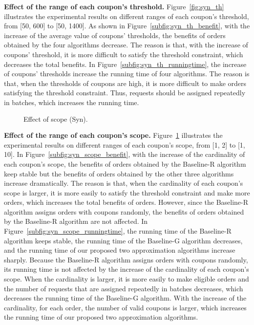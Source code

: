 \textbf{Effect of the range of each coupon's threshold.} Figure~\ref{fig:syn_th} illustrates the experimental results on different ranges of each coupon's threshold, from [50, 600] to [50, 1400]. As shown in Figure~\ref{subfig:syn_th_benefit}, with the increase of the average value of coupons' thresholds, the benefits of orders obtained by the four algorithms decrease. The reason is that, with the increase of coupons' threshold, it is more difficult to satisfy the threshold constraint, which decreases the total benefits. In Figure~\ref{subfig:syn_th_runningtime}, the increase of coupons' thresholds increase the running time of four algorithms. The reason is that, when the thresholds of coupons are high, it is more difficult to make orders satisfying the threshold constraint. Thus, requests should be assigned repeatedly in batches, which increases the running time.

\begin{figure}[t!]\centering
	\subfigcapskip=-5pt
	\vspace{-2ex}
	\addtocounter{subfigure}{-1}
	\figureCaptionMargin
	\vspace{1ex}
	\caption{\small Effect of scope (Syn).}\figureBelowMargin
	\label{fig:syn_scope}
\end{figure}

\textbf{Effect of the range of each coupon's scope.} Figure~\ref{fig:syn_scope} illustrates the experimental results on different ranges of each coupon's scope, from [1, 2] to [1, 10]. In Figure~\ref{subfig:syn_scope_benefit}, with the increase of the cardinality of each coupon's scope, the benefits of orders obtained by the Baseline-R algorithm keep stable but the benefits of orders obtained by the other three algorithms increase dramatically. The reason is that, when the cardinality of each coupon's scope is larger, it is more easily to satisfy the threshold constraint and make more orders, which increases the total benefits of orders. However, since the Baseline-R algorithm assigns orders with coupons randomly, the benefits of orders obtained by the Baseline-R algorithm are not affected. In Figure~\ref{subfig:syn_scope_runningtime}, the running time of the Baseline-R algorithm keeps stable, the running time of the Baseline-G algorithm decreases, and the running time of our proposed two approximation algorithms increase sharply. Because the Baseline-R algorithm assigns orders with coupons randomly, its running time is not affected by the increase of the cardinality of each coupon's scope. When the cardinality is larger, it is more easily to make eligible orders and the number of requests that are assigned repeatedly in batches decreases, which decreases the running time of the Baseline-G algorithm. With the increase of the cardinality, for each order, the number of valid coupons is larger, which increases the running time of our proposed two approximation algorithms.

